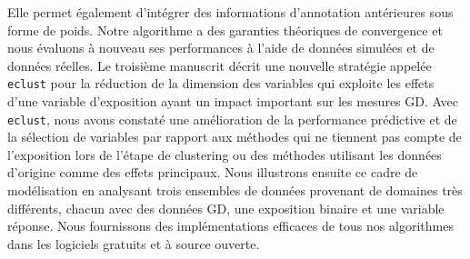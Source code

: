 \documentclass[12pt,letterpaper]{report}
\begin{document}
\begin{romanPagenumber}{2}
{Elle permet également d'intégrer des informations d'annotation antérieures sous forme de poids. 
Notre algorithme a des garanties théoriques de convergence et nous évaluons à nouveau ses performances à l'aide de données simulées et de données réelles. 
Le troisième manuscrit décrit une nouvelle stratégie appelée \texttt{eclust} pour la réduction de la dimension des variables qui exploite les effets d'une variable d'exposition ayant un impact important sur les mesures GD. Avec \texttt{eclust}, nous avons constaté une amélioration de la performance prédictive et de la sélection de variables par rapport aux méthodes qui ne tiennent pas compte de l'exposition lors de l'étape de clustering ou des méthodes utilisant les données d'origine comme des effets principaux. Nous illustrons ensuite ce cadre de modélisation en analysant trois ensembles de données provenant de domaines très différents, chacun avec des données GD, une exposition binaire et une variable réponse. Nous fournissons des implémentations efficaces de tous nos algorithmes dans les logiciels gratuits et à source ouverte.
	}
	\AbstractFr
	
	
	\tableofcontents 

	\listoftables 
	\listoffigures
	
	\newpage
	
	\printacronyms[include-classes=abbrev,name=Abbreviations]
	\end{romanPagenumber}

\else
\fi


\doublespacing

\ifthesis
	
	
	
	
	
	
	
\else
	
	
	
	
	
	
	
\fi
\end{document}
